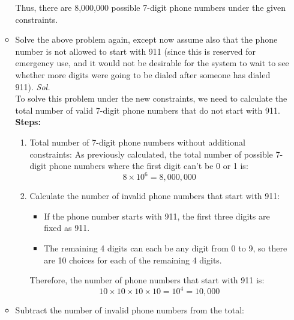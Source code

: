 \documentclass{book}
\begin{document}
\begin{enumerate}
\begin{itemize}
		            Thus, there are 8,000,000 possible 7-digit phone numbers under the given constraints.
		      \item  Solve the above problem again, except now assume also that
		            the phone number is not allowed to start with 911 (since
		            this is reserved for emergency use, and it would not be
		            desirable for the system to wait to see whether more digits
		            were going to be dialed after someone has dialed 911).
		            \textit{ Sol. }\\
		            To solve this problem under the new constraints, we need to calculate the total number of valid 7-digit phone numbers that do not start with 911.\\
		            \textbf{Steps:}
		            \begin{enumerate}
			            \item Total number of 7-digit phone numbers without additional constraints:
			                  As previously calculated, the total number of possible 7-digit phone numbers where the first digit can't be 0 or 1 is:
			                  \[
				                  8×10^6
				                  =8,000,000
			                  \]
			            \item Calculate the number of invalid phone numbers that start with 911:
			                  \begin{itemize}
				                  \item If the phone number starts with 911, the first three digits are fixed as 911.
				                  \item The remaining 4 digits can each be any digit from 0 to 9, so there are
				                        10 choices for each of the remaining 4 digits.
			                  \end{itemize}
			                  Therefore, the number of phone numbers that start with 911 is:
			                  \[
				                  10
				                  ×
				                  10
				                  ×
				                  10
				                  ×
				                  10
				                  =
				                  1
				                  0
				                  ^4
				                  =
				                  10
				                  ,
				                  000
			                  \]

		            \end{enumerate}
		      \item Subtract the number of invalid phone numbers from the total:\\


\end{itemize}
\end{enumerate}
\end{document}
